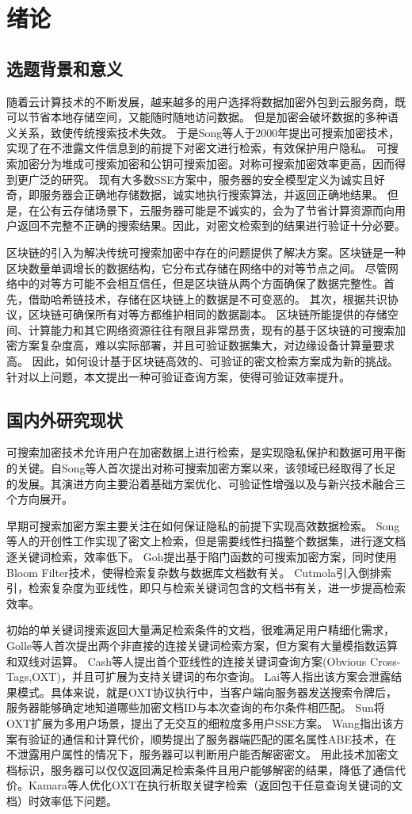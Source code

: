 \chapter{绪论}
\section{选题背景和意义}
随着云计算技术的不断发展，越来越多的用户选择将数据加密外包到云服务商，既可以节省本地存储空间，又能随时随地访问数据。
但是加密会破坏数据的多种语义关系，致使传统搜索技术失效。
于是Song等人于2000年提出可搜索加密技术，实现了在不泄露文件信息到的前提下对密文进行检索，有效保护用户隐私。
可搜索加密分为堆成可搜索加密和公钥可搜索加密。对称可搜索加密效率更高，因而得到更广泛的研究。
现有大多数SSE方案中，服务器的安全模型定义为诚实且好奇，即服务器会正确地存储数据，诚实地执行搜索算法，并返回正确地结果。
但是，在公有云存储场景下，云服务器可能是不诚实的，会为了节省计算资源而向用户返回不完整不正确的搜索结果。因此，对密文检索到的结果进行验证十分必要。

区块链的引入为解决传统可搜索加密中存在的问题提供了解决方案。区块链是一种区块数量单调增长的数据结构，它分布式存储在网络中的对等节点之间。
尽管网络中的对等方可能不会相互信任，但是区块链从两个方面确保了数据完整性。首先，借助哈希链技术，存储在区块链上的数据是不可变恶的。
其次，根据共识协议，区块链可确保所有对等方都维护相同的数据副本。
区块链所能提供的存储空间、计算能力和其它网络资源往往有限且非常昂贵，现有的基于区块链的可搜索加密方案复杂度高，难以实际部署，并且可验证数据集大，对边缘设备计算量要求高。
因此，如何设计基于区块链高效的、可验证的密文检索方案成为新的挑战。针对以上问题，本文提出一种可验证查询方案，使得可验证效率提升。
\section{国内外研究现状}
可搜索加密技术允许用户在加密数据上进行检索，是实现隐私保护和数据可用平衡的关键。自Song等人首次提出对称可搜索加密方案以来，该领域已经取得了长足的发展。其演进方向主要沿着基础方案优化、可验证性增强以及与新兴技术融合三个方向展开。

早期可搜索加密方案主要关注在如何保证隐私的前提下实现高效数据检索。
Song等人的开创性工作实现了密文上检索，但是需要线性扫描整个数据集，进行逐文档逐关键词检索，效率低下。
Goh提出基于陷门函数的可搜索加密方案，同时使用Bloom Filter技术，使得检索复杂数与数据库文档数有关。
Cutmola引入倒排索引，检索复杂度为亚线性，即只与检索关键词包含的文档书有关，进一步提高检索效率。
    
初始的单关键词搜索返回大量满足检索条件的文档，很难满足用户精细化需求，Golle等人首次提出两个非直接的连接关键词检索方案，但方案有大量模指数运算和双线对运算。
Cash等人提出首个亚线性的连接关键词查询方案(Obvious Cross-Tags,OXT)，并且可扩展为支持关键词的布尔查询。
Lai等人指出该方案会泄露结果模式。具体来说，就是OXT协议执行中，当客户端向服务器发送搜索令牌后，服务器能够确定地知道哪些加密文档ID与本次查询的布尔条件相匹配。
Sun将OXT扩展为多用户场景，提出了无交互的细粒度多用户SSE方案。
Wang指出该方案有验证的通信和计算代价，顺势提出了服务器端匹配的匿名属性ABE技术，在不泄露用户属性的情况下，服务器可以判断用户能否解密密文。
用此技术加密文档标识，服务器可以仅仅返回满足检索条件且用户能够解密的结果，降低了通信代价。Kamara等人优化OXT在执行析取关键字检索（返回包干任意查询关键词的文档）时效率低下问题。
    
